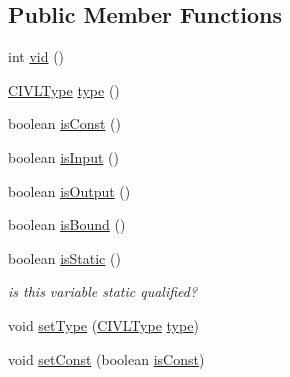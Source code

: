 \subsection*{Public Member Functions}
\begin{DoxyCompactItemize}
\item 
int \hyperlink{interfaceedu_1_1udel_1_1cis_1_1vsl_1_1civl_1_1model_1_1IF_1_1variable_1_1Variable_a06a31f6ced900bf13bf45414e2e05b8b}{vid} ()
\item 
\hyperlink{interfaceedu_1_1udel_1_1cis_1_1vsl_1_1civl_1_1model_1_1IF_1_1type_1_1CIVLType}{C\+I\+V\+L\+Type} \hyperlink{interfaceedu_1_1udel_1_1cis_1_1vsl_1_1civl_1_1model_1_1IF_1_1variable_1_1Variable_a0a3f30877296fd973dad30d7530d7dab}{type} ()
\item 
boolean \hyperlink{interfaceedu_1_1udel_1_1cis_1_1vsl_1_1civl_1_1model_1_1IF_1_1variable_1_1Variable_ad079829baf60becbf665c01c88d0c685}{is\+Const} ()
\item 
boolean \hyperlink{interfaceedu_1_1udel_1_1cis_1_1vsl_1_1civl_1_1model_1_1IF_1_1variable_1_1Variable_adcc5f863ba9cb47e71b823942061ee7e}{is\+Input} ()
\item 
boolean \hyperlink{interfaceedu_1_1udel_1_1cis_1_1vsl_1_1civl_1_1model_1_1IF_1_1variable_1_1Variable_a3a944bf4dddc5f7ca230f08ca2e8e843}{is\+Output} ()
\item 
boolean \hyperlink{interfaceedu_1_1udel_1_1cis_1_1vsl_1_1civl_1_1model_1_1IF_1_1variable_1_1Variable_a5fd716d71743070263b8a9c2f3b4bb15}{is\+Bound} ()
\item 
boolean \hyperlink{interfaceedu_1_1udel_1_1cis_1_1vsl_1_1civl_1_1model_1_1IF_1_1variable_1_1Variable_a6e7f0023fc1779257d2839b14ae6d9bc}{is\+Static} ()
\begin{DoxyCompactList}\small\item\em is this variable static qualified? \end{DoxyCompactList}\item 
void \hyperlink{interfaceedu_1_1udel_1_1cis_1_1vsl_1_1civl_1_1model_1_1IF_1_1variable_1_1Variable_a9b5a486869c202745752bb3f9b1bd3ca}{set\+Type} (\hyperlink{interfaceedu_1_1udel_1_1cis_1_1vsl_1_1civl_1_1model_1_1IF_1_1type_1_1CIVLType}{C\+I\+V\+L\+Type} \hyperlink{interfaceedu_1_1udel_1_1cis_1_1vsl_1_1civl_1_1model_1_1IF_1_1variable_1_1Variable_a0a3f30877296fd973dad30d7530d7dab}{type})
\item 
void \hyperlink{interfaceedu_1_1udel_1_1cis_1_1vsl_1_1civl_1_1model_1_1IF_1_1variable_1_1Variable_a5ba0d3c903cbe22b1fb2bc0290178774}{set\+Const} (boolean \hyperlink{interfaceedu_1_1udel_1_1cis_1_1vsl_1_1civl_1_1model_1_1IF_1_1variable_1_1Variable_ad079829baf60becbf665c01c88d0c685}{is\+Const})

\end{DoxyCompactItemize}
